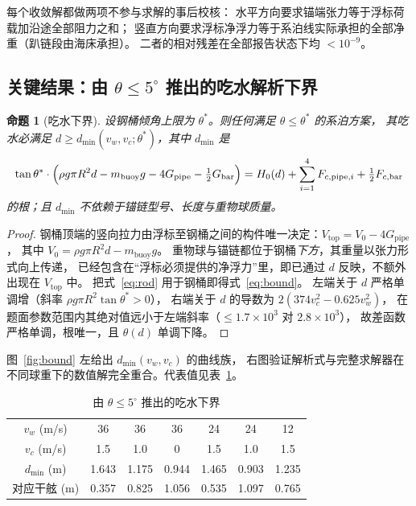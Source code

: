 \documentclass[UTF8,a4paper,zihao=-4]{ctexart}
\newtheorem{proposition}{命题}
\begin{document}
每个收敛解都做两项不参与求解的事后校核：
水平方向要求锚端张力等于浮标荷载加沿途全部阻力之和；
竖直方向要求浮标净浮力等于系泊线实际承担的全部净重（趴链段由海床承担）。
二者的相对残差在全部报告状态下均 \(<10^{-9}\)。

\subsection{关键结果：由 \(\theta\le5^\circ\) 推出的吃水解析下界}\label{sec:bound}

\begin{proposition}[吃水下界]
设钢桶倾角上限为 \(\theta^*\)。则任何满足 \(\theta\le\theta^*\) 的系泊方案，
其吃水必满足 \(d\ge d_{\min}(v_w,v_c;\theta^*)\)，其中 \(d_{\min}\) 是
\begin{equation}\label{eq:bound}
\tan\theta^*\cdot\Bigl(\rho g\pi R^2d-m_{\mathrm{buoy}}g-4G_{\mathrm{pipe}}-\tfrac12G_{\mathrm{bar}}\Bigr)
=H_0(d)+\sum_{i=1}^{4}F_{c,\mathrm{pipe},i}+\tfrac12F_{c,\mathrm{bar}}
\end{equation}
的根；且 \(d_{\min}\) 不依赖于锚链型号、长度与重物球质量。
\end{proposition}

\begin{proof}
钢桶顶端的竖向拉力由浮标至钢桶之间的构件唯一决定：\(V_{\mathrm{top}}=V_0-4G_{\mathrm{pipe}}\)，
其中 \(V_0=\rho g\pi R^2d-m_{\mathrm{buoy}}g\)。
重物球与锚链都位于钢桶\emph{下方}，其重量以张力形式向上传递，
已经包含在“浮标必须提供的净浮力”里，即已通过 \(d\) 反映，不额外出现在 \(V_{\mathrm{top}}\) 中。
把式~\eqref{eq:rod} 用于钢桶即得式~\eqref{eq:bound}。
左端关于 \(d\) 严格单调增（斜率 \(\rho g\pi R^2\tan\theta^*>0\)），
右端关于 \(d\) 的导数为 \(2(374v_c^2-0.625v_w^2)\)，
在题面参数范围内其绝对值远小于左端斜率（\(\le1.7\times10^3\) 对 \(2.8\times10^3\)），
故差函数严格单调，根唯一，且 \(\theta(d)\) 单调下降。
\end{proof}

图~\ref{fig:bound} 左给出 \(d_{\min}(v_w,v_c)\) 的曲线族，
右图验证解析式与完整求解器在不同球重下的数值解完全重合。代表值见表~\ref{tab:bound}。

\begin{table}[H]
\centering
\caption{由 \(\theta\le5^\circ\) 推出的吃水下界}
\label{tab:bound}
\begin{tabular}{ccccccc}
\toprule
\(v_w\) (m/s) & 36 & 36 & 36 & 24 & 24 & 12 \\
\(v_c\) (m/s) & 1.5 & 1.0 & 0 & 1.5 & 1.0 & 1.5 \\
\midrule
\(d_{\min}\) (m) & 1.643 & 1.175 & 0.944 & 1.465 & 0.903 & 1.235 \\
对应干舷 (m) & 0.357 & 0.825 & 1.056 & 0.535 & 1.097 & 0.765 \\
\bottomrule
\end{tabular}
\end{table}
\end{document}
